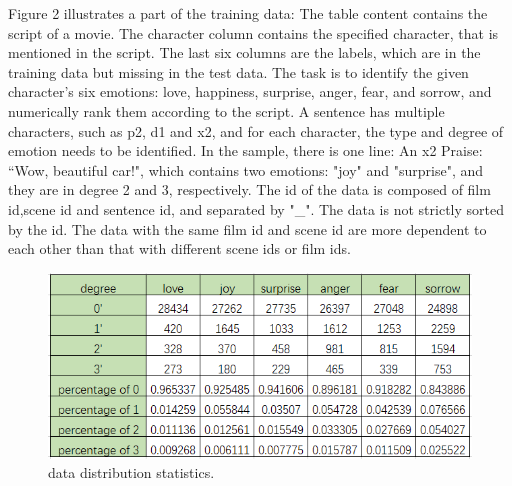 \documentclass[12pt,twocolumn,letterpaper]{article}
\begin{document}
 Figure 2 illustrates a part of the training data: The table content contains the script of a movie. The character column contains the specified character, that is mentioned in the script. The last six columns are the labels, which are in the training data but missing in the test data. The task is to identify the given character’s six emotions: love, happiness, surprise, anger, fear, and sorrow, and numerically rank them according to the script. A sentence has multiple characters, such as p2, d1 and x2, and for each character, the type and degree of emotion needs to be identified. In the sample, there is one line: An x2 Praise: “Wow, beautiful car!", which contains two emotions: "joy" and "surprise", and they are in degree 2 and 3, respectively. The id of the data is composed of film id,scene id and sentence id, and separated by "\_". The data is not strictly sorted by the id. The data with the same film id and scene id are more dependent to each other than that with different scene ids or film ids.
\begin{figure}
\begin{center}
\includegraphics[scale=0.6]{data distribution.png}
\end{center}
   \caption{data distribution statistics.}
\label{fig:short}
\end{figure}
\end{document}
